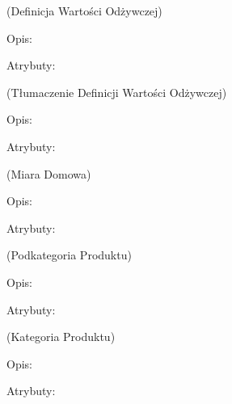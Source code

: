\begin{enumerate}[label={\textbf{KAT/\protect\threedigits{\theenumi}}}, wide, labelwidth=!, labelindent=0pt, labelsep=0pt, series=reqs]
     \label{kat:NutritionDefinition} (Definicja Wartości Odżywczej)

    Opis: \lipsum[1]
    \par
    Atrybuty:
    \begin{itemize}[series=atr]
         \label{kat:NutritionDefinition:id}
         \label{kat:NutritionDefinition:tag}
         \label{kat:NutritionDefinition:description}
         \label{kat:NutritionDefinition:units}
         \label{kat:NutritionDefinition:decimalPlaces}
    \end{itemize}

     \label{kat:NutritionDefinitionTranslation} (Tłumaczenie Definicji Wartości Odżywczej)

    Opis: \lipsum[1]
    \par
    Atrybuty:
    \begin{itemize}[series=atr]
         \label{kat:NutritionDefinitionTranslation:id}
         \label{kat:NutritionDefinitionTranslation:translation}
         \label{kat:NutritionDefinitionTranslation:language}
    \end{itemize}

     \label{kat:HouseholdMeasure} (Miara Domowa)

    Opis: \lipsum[1]
    \par
    Atrybuty:
    \begin{itemize}[series=atr]
         \label{kat:HouseholdMeasure:id}
         \label{kat:HouseholdMeasure:description}
         \label{kat:HouseholdMeasure:gramsWeight}
         \label{kat:HouseholdMeasure:isVisible}
    \end{itemize}

     \label{kat:ProductSubcategory} (Podkategoria Produktu)

    Opis: \lipsum[1]
    \par
    Atrybuty:
    \begin{itemize}[series=atr]
         \label{kat:ProductSubcategory:id}
         \label{kat:ProductSubcategory:description}
    \end{itemize}

     \label{kat:ProductCategory} (Kategoria Produktu)

    Opis: \lipsum[1]
    \par
    Atrybuty:
    \begin{itemize}[series=atr]
         \label{kat:ProductCategory:id}
         \label{kat:ProductCategory:description}
    \end{itemize}


\end{enumerate}
